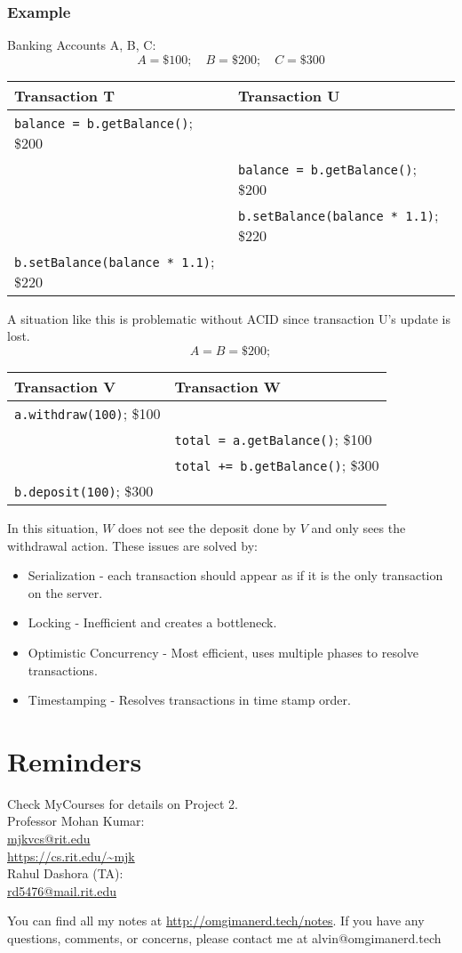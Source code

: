 \documentclass{math}
\begin{document}
\subsubsection*{Example}
Banking Accounts A, B, C:
\[ A = \$100; \quad B = \$200; \quad C = \$300 \]
\begin{center}
  \begin{tabular}{l|l}
    \textbf{Transaction T} & \textbf{Transaction U} \\
    \hline
    \texttt{balance = b.getBalance()}; \$200 & \\
    & \texttt{balance = b.getBalance()}; \$200 \\
    & \texttt{b.setBalance(balance * 1.1)}; \$220 \\
    \texttt{b.setBalance(balance * 1.1)}; \$220 &
  \end{tabular}
\end{center}
A situation like this is problematic without ACID since transaction U's update
is lost.
\[ A = B = \$200; \]
\begin{center}
  \begin{tabular}{l|l}
    \textbf{Transaction V} & \textbf{Transaction W} \\
    \hline
    \texttt{a.withdraw(100)}; \$100 & \\
    & \texttt{total = a.getBalance()}; \$100 \\
    & \texttt{total += b.getBalance()}; \$300 \\
    \texttt{b.deposit(100)}; \$300 &
  \end{tabular}
\end{center}
In this situation, \( W \) does not see the deposit done by \( V \) and only
sees the withdrawal action. These issues are solved by:
\begin{itemize}
  \item Serialization - each transaction should appear as if it is the only
  transaction on the server.
  \item Locking - Inefficient and creates a bottleneck.
  \item Optimistic Concurrency - Most efficient, uses multiple phases to resolve
  transactions.
  \item Timestamping - Resolves transactions in time stamp order.
\end{itemize}

\section*{Reminders}
Check MyCourses for details on Project 2. \\
\noindent Professor Mohan Kumar: \\
\url{mjkvcs@rit.edu} \\
\url{https://cs.rit.edu/~mjk} \\

\noindent Rahul Dashora (TA): \\
\url{rd5476@mail.rit.edu} \\

\begin{center}
  You can find all my notes at \url{http://omgimanerd.tech/notes}. If you have
  any questions, comments, or concerns, please contact me at
  alvin@omgimanerd.tech
\end{center}
\end{document}
